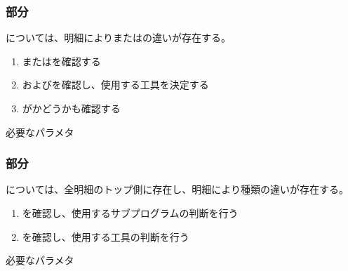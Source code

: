 \subsubsection{\OutcutMilling 部分}
\OutcutMilling については、明細により\OutcutExists または\OutcutTaperExists の違いが存在する。
\begin{enumerate}[label=\sarrow]
\item \TopOutcutExists または\BottomOutcutExists を確認する
\item \TopOutcutTaperExists および\BottomOutcutTaperExists を確認し、使用する工具を決定する
\item \nameOutcut が\CurvedOutcut かどうかも確認する
\end{enumerate}
\begin{Parameter}{必要なパラメタ}
\PMTopOutcutExists%
\PMBottomOutcutExists%
\PMTopOutcutTaperExists%
\PMBottomOutcutTaperExists%
\end{Parameter}

\subsubsection{\KeywayMilling 部分}
\KeywayMilling については、全明細のトップ側に存在し、明細により種類の違いが存在する。
\begin{enumerate}[label=\sarrow]
\item \nameKeywayType を確認し、使用するサブプログラムの判断を行う
\item \nameKeywayWidth を確認し、使用する工具の判断を行う
\end{enumerate}
\begin{Parameter}{必要なパラメタ}
\PMKeywayType%
\PMTopOutcutExists%
\PMKeywayWidth%
\end{Parameter}

